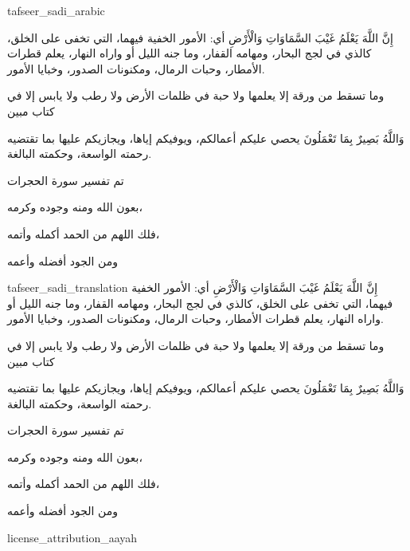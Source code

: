 \begin{taggedblock}{tafseer_sadi_arabic}
\begin{Arabic}
{ إِنَّ اللَّهَ يَعْلَمُ غَيْبَ السَّمَاوَاتِ وَالْأَرْضِ }
أي: الأمور الخفية فيهما، التي تخفى على الخلق، كالذي في لجج البحار، ومهامه القفار، وما جنه الليل أو واراه النهار، يعلم قطرات الأمطار، وحبات الرمال، ومكنونات الصدور، وخبايا الأمور.

{ وما تسقط من ورقة إلا يعلمها ولا حبة في ظلمات الأرض ولا رطب ولا يابس إلا في كتاب مبين }

{ وَاللَّهُ بَصِيرٌ بِمَا تَعْمَلُونَ }
يحصي عليكم أعمالكم، ويوفيكم إياها، ويجازيكم عليها بما تقتضيه رحمته الواسعة، وحكمته البالغة.

تم تفسير سورة الحجرات

بعون الله ومنه وجوده وكرمه،

فلك اللهم من الحمد أكمله وأتمه،

ومن الجود أفضله وأعمه
\end{Arabic}
\end{taggedblock}
\begin{taggedblock}{tafseer_sadi_translation}
{ إِنَّ اللَّهَ يَعْلَمُ غَيْبَ السَّمَاوَاتِ وَالْأَرْضِ }
أي: الأمور الخفية فيهما، التي تخفى على الخلق، كالذي في لجج البحار، ومهامه القفار، وما جنه الليل أو واراه النهار، يعلم قطرات الأمطار، وحبات الرمال، ومكنونات الصدور، وخبايا الأمور.

{ وما تسقط من ورقة إلا يعلمها ولا حبة في ظلمات الأرض ولا رطب ولا يابس إلا في كتاب مبين }

{ وَاللَّهُ بَصِيرٌ بِمَا تَعْمَلُونَ }
يحصي عليكم أعمالكم، ويوفيكم إياها، ويجازيكم عليها بما تقتضيه رحمته الواسعة، وحكمته البالغة.

تم تفسير سورة الحجرات

بعون الله ومنه وجوده وكرمه،

فلك اللهم من الحمد أكمله وأتمه،

ومن الجود أفضله وأعمه
\end{taggedblock}
\begin{taggedblock}{license_attribution_aayah}

\end{taggedblock}
\begin{comment}
Please use the following for footnotes:- Sample\footnoteQ{Text of Qur'an footnote goes here.}.
Sample\footnoteT{Text of Tafseer footnote goes here.}.
\end{comment}